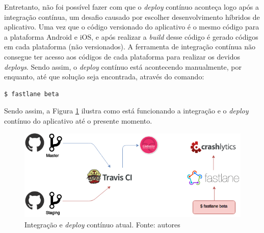 Entretanto, não foi possível fazer com que o \textit{deploy} contínuo aconteça logo após a integração contínua, um desafio causado por escolher desenvolvimento híbridos de aplicativo. Uma vez que o código versionado do aplicativo é o mesmo código para a plataforma Android e iOS, e após realizar a \textit{build} desse código é gerado códigos em cada plataforma (não versionados). A ferramenta de integração contínua não consegue ter acesso aos códigos de cada plataforma para realizar os devidos \textit{deploys}. Sendo assim, o \textit{deploy} contínuo está acontecendo manualmente, por enquanto, até que solução seja encontrada, através do comando:

\begin{lstlisting}[language=bash]
  $ fastlane beta
\end{lstlisting}

Sendo assim, a Figura \ref{img:integracao_deploy_continuo_atual} ilustra como está funcionando a integração e o \textit{deploy} contínuo do aplicativo até o presente momento.

\begin{figure}[H]
    \centering
    \includegraphics[scale=0.5]{figuras/ci_currently.png}
    \caption[Integração e \textit{deploy} contínuo atual]{Integração e \textit{deploy} contínuo atual. Fonte: autores}
    \label{img:integracao_deploy_continuo_atual}
\end{figure}
